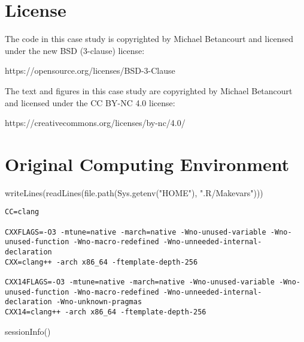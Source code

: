 \documentclass[
  letterpaper,
  DIV=11,
  numbers=noendperiod]{scrartcl}
\newenvironment{Shaded}{\begin{snugshade}}{\end{snugshade}}
\newcommand{\FunctionTok}[1]{\textcolor[rgb]{0.28,0.35,0.67}{#1}}
\newcommand{\NormalTok}[1]{\textcolor[rgb]{0.00,0.23,0.31}{#1}}
\newcommand{\StringTok}[1]{\textcolor[rgb]{0.13,0.47,0.30}{#1}}
\begin{document}
\section*{License}\label{license}

The code in this case study is copyrighted by Michael Betancourt and
licensed under the new BSD (3-clause) license:

https://opensource.org/licenses/BSD-3-Clause

The text and figures in this case study are copyrighted by Michael
Betancourt and licensed under the CC BY-NC 4.0 license:

https://creativecommons.org/licenses/by-nc/4.0/

\section*{Original Computing
Environment}\label{original-computing-environment}

\begin{Shaded}
\begin{Highlighting}[]
\FunctionTok{writeLines}\NormalTok{(}\FunctionTok{readLines}\NormalTok{(}\FunctionTok{file.path}\NormalTok{(}\FunctionTok{Sys.getenv}\NormalTok{(}\StringTok{"HOME"}\NormalTok{), }\StringTok{".R/Makevars"}\NormalTok{)))}
\end{Highlighting}
\end{Shaded}

\begin{verbatim}
CC=clang

CXXFLAGS=-O3 -mtune=native -march=native -Wno-unused-variable -Wno-unused-function -Wno-macro-redefined -Wno-unneeded-internal-declaration
CXX=clang++ -arch x86_64 -ftemplate-depth-256

CXX14FLAGS=-O3 -mtune=native -march=native -Wno-unused-variable -Wno-unused-function -Wno-macro-redefined -Wno-unneeded-internal-declaration -Wno-unknown-pragmas
CXX14=clang++ -arch x86_64 -ftemplate-depth-256
\end{verbatim}

\begin{Shaded}
\begin{Highlighting}[]
\FunctionTok{sessionInfo}\NormalTok{()}
\end{Highlighting}
\end{Shaded}
\end{document}
